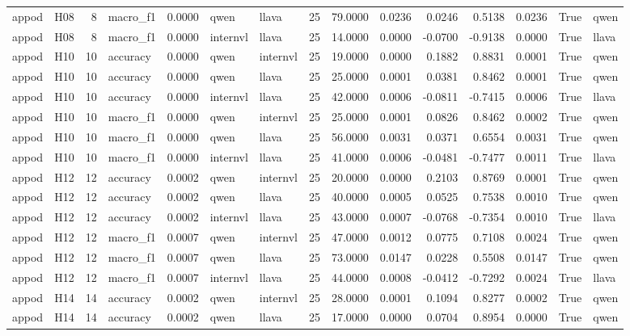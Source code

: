 \begin{table}[tbp]
\begin{tabular}{llrlrllrrrrrrrl}
appod & H08 & 8 & macro\_f1 & 0.0000 & qwen & llava & 25 & 79.0000 & 0.0236 & 0.0246 & 0.5138 & 0.0236 & True & qwen \\
appod & H08 & 8 & macro\_f1 & 0.0000 & internvl & llava & 25 & 14.0000 & 0.0000 & -0.0700 & -0.9138 & 0.0000 & True & llava \\
appod & H10 & 10 & accuracy & 0.0000 & qwen & internvl & 25 & 19.0000 & 0.0000 & 0.1882 & 0.8831 & 0.0001 & True & qwen \\
appod & H10 & 10 & accuracy & 0.0000 & qwen & llava & 25 & 25.0000 & 0.0001 & 0.0381 & 0.8462 & 0.0001 & True & qwen \\
appod & H10 & 10 & accuracy & 0.0000 & internvl & llava & 25 & 42.0000 & 0.0006 & -0.0811 & -0.7415 & 0.0006 & True & llava \\
appod & H10 & 10 & macro\_f1 & 0.0000 & qwen & internvl & 25 & 25.0000 & 0.0001 & 0.0826 & 0.8462 & 0.0002 & True & qwen \\
appod & H10 & 10 & macro\_f1 & 0.0000 & qwen & llava & 25 & 56.0000 & 0.0031 & 0.0371 & 0.6554 & 0.0031 & True & qwen \\
appod & H10 & 10 & macro\_f1 & 0.0000 & internvl & llava & 25 & 41.0000 & 0.0006 & -0.0481 & -0.7477 & 0.0011 & True & llava \\
appod & H12 & 12 & accuracy & 0.0002 & qwen & internvl & 25 & 20.0000 & 0.0000 & 0.2103 & 0.8769 & 0.0001 & True & qwen \\
appod & H12 & 12 & accuracy & 0.0002 & qwen & llava & 25 & 40.0000 & 0.0005 & 0.0525 & 0.7538 & 0.0010 & True & qwen \\
appod & H12 & 12 & accuracy & 0.0002 & internvl & llava & 25 & 43.0000 & 0.0007 & -0.0768 & -0.7354 & 0.0010 & True & llava \\
appod & H12 & 12 & macro\_f1 & 0.0007 & qwen & internvl & 25 & 47.0000 & 0.0012 & 0.0775 & 0.7108 & 0.0024 & True & qwen \\
appod & H12 & 12 & macro\_f1 & 0.0007 & qwen & llava & 25 & 73.0000 & 0.0147 & 0.0228 & 0.5508 & 0.0147 & True & qwen \\
appod & H12 & 12 & macro\_f1 & 0.0007 & internvl & llava & 25 & 44.0000 & 0.0008 & -0.0412 & -0.7292 & 0.0024 & True & llava \\
appod & H14 & 14 & accuracy & 0.0002 & qwen & internvl & 25 & 28.0000 & 0.0001 & 0.1094 & 0.8277 & 0.0002 & True & qwen \\
appod & H14 & 14 & accuracy & 0.0002 & qwen & llava & 25 & 17.0000 & 0.0000 & 0.0704 & 0.8954 & 0.0000 & True & qwen \\

\end{tabular}
\end{table}
